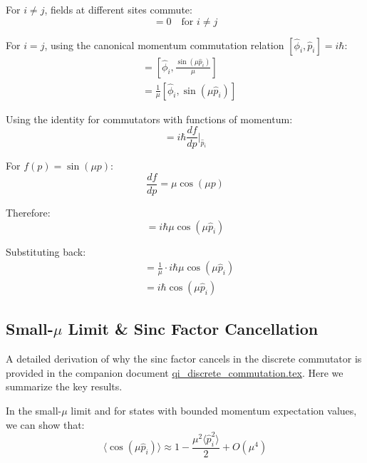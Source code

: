 \documentclass[12pt]{article}
\begin{document}
For $i \neq j$, fields at different sites commute:
\begin{equation}
[\hat{\phi}_i, \hat{\pi}_j^{\text{poly}}] = 0 \quad \text{for } i \neq j
\end{equation}

For $i = j$, using the canonical momentum commutation relation $[\hat{\phi}_i, \hat{p}_i] = i\hbar$:
\begin{align}
[\hat{\phi}_i, \hat{\pi}_i^{\text{poly}}] &= [\hat{\phi}_i, \frac{\sin(\mu \hat{p}_i)}{\mu}] \\
&= \frac{1}{\mu}[\hat{\phi}_i, \sin(\mu \hat{p}_i)]
\end{align}

Using the identity for commutators with functions of momentum:
\begin{equation}
[\hat{\phi}_i, f(\hat{p}_i)] = i\hbar \frac{df}{dp}\bigg|_{\hat{p}_i}
\end{equation}

For $f(p) = \sin(\mu p)$:
\begin{equation}
\frac{df}{dp} = \mu \cos(\mu p)
\end{equation}

Therefore:
\begin{equation}
[\hat{\phi}_i, \sin(\mu \hat{p}_i)] = i\hbar \mu \cos(\mu \hat{p}_i)
\end{equation}

Substituting back:
\begin{align}
[\hat{\phi}_i, \hat{\pi}_i^{\text{poly}}] &= \frac{1}{\mu} \cdot i\hbar \mu \cos(\mu \hat{p}_i) \\
&= i\hbar \cos(\mu \hat{p}_i)
\end{align}

\subsection{Small-$\mu$ Limit \& Sinc Factor Cancellation}

A detailed derivation of why the sinc factor cancels in the discrete commutator is provided in the companion document \href{file:qi_discrete_commutation.tex}{qi\_discrete\_commutation.tex}. Here we summarize the key results.

In the small-$\mu$ limit and for states with bounded momentum expectation values, we can show that:
\begin{equation}
\langle \cos(\mu \hat{p}_i) \rangle \approx 1 - \frac{\mu^2 \langle \hat{p}_i^2 \rangle}{2} + O(\mu^4)
\end{equation}
\end{document}

